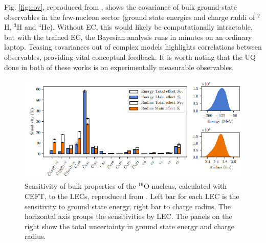 \documentclass[%
 reprint,
 amsmath,amssymb,
 aps,
]{revtex4-2}
\begin{document}
Fig. \ref{fig:cov}, reproduced from \cite{konig2020eigenvector}, shows the covariance of bulk ground-state observables in the few-nucleon sector (ground state energies and charge raddi of $^2$H, $^3$H and $^4$He). Without \ac{EC}, this would likely be computationally intractable, but with the trained EC, the Bayesian analysis runs in minutes on an ordinary laptop. Teasing covariances out of complex models highlights correlations between observables, providing
vital conceptual feedback. It is worth noting that the \ac{UQ} done in both of these works is on experimentally measurable observables.

\begin{figure}[tpb]
  \centering
  \includegraphics[width=0.99\linewidth]{./LEC_sensitivity.png}
  \caption{Sensitivity of bulk properties of the $^{16}$O nucleus, calculated with \ac{CEFT}, to the \ac{LEC}s, reproduced from \cite{ekstrom2019global}. Left bar for each \ac{LEC} is the sensitivity to ground state energy, right bar to charge radius. The horizontal axis groups the sensitivities by LEC. The panels on the right show the total uncertainty in ground state energy and charge radius.}
  \label{fig:sense}
\end{figure}
\end{document}
